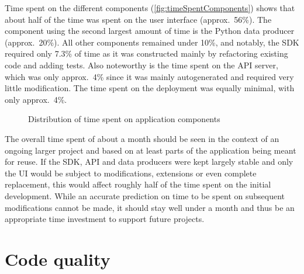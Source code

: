 Time spent on the different components (\autoref{fig:timeSpentComponents}) shows that about half of the time was spent on the user interface (approx.~56\%). The component using the second largest amount of time is the Python data producer (approx.~20\%).
All other components remained under 10\%, and notably, the \ac{SDK} required only 7.3\% of time as it was constructed mainly by refactoring existing code and adding tests.
Also noteworthy is the time spent on the \ac{API} server, which was only approx.~4\% since it was mainly autogenerated and required very little modification.
The time spent on the deployment was equally minimal, with only approx.~4\%.

\begin{figure*}[!ht]
\centering
\hfill
\caption[Time spent by application components]{Distribution of time spent on application components\protect}
\label{fig:timeSpentComponents}
\end{figure*}

The overall time spent of about a month should be seen in the context of an ongoing larger project and based on at least parts of the application being meant for reuse.
If the \ac{SDK}, \ac{API} and data producers were kept largely stable and only the \ac{UI} would be subject to modifications, extensions or even complete replacement, this would affect roughly half of the time spent on the initial development.
While an accurate prediction on time to be spent on subsequent modifications cannot be made, it should stay well under a month and thus be an appropriate time investment to support future projects.

\section{Code quality}
\label{sec:code-quality}

